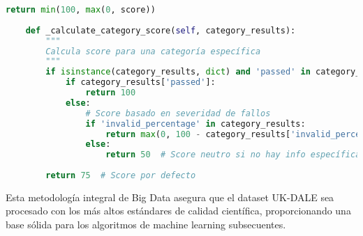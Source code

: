 \begin{lstlisting}[language=Python, caption=Framework de validación de calidad de datos]
        return min(100, max(0, score))
    
    def _calculate_category_score(self, category_results):
        """
        Calcula score para una categoría específica
        """
        if isinstance(category_results, dict) and 'passed' in category_results:
            if category_results['passed']:
                return 100
            else:
                # Score basado en severidad de fallos
                if 'invalid_percentage' in category_results:
                    return max(0, 100 - category_results['invalid_percentage'] * 10)
                else:
                    return 50  # Score neutro si no hay info específica
        
        return 75  # Score por defecto
\end{lstlisting}

Esta metodología integral de Big Data asegura que el dataset UK-DALE sea procesado con los más altos estándares de calidad científica, proporcionando una base sólida para los algoritmos de machine learning subsecuentes.
